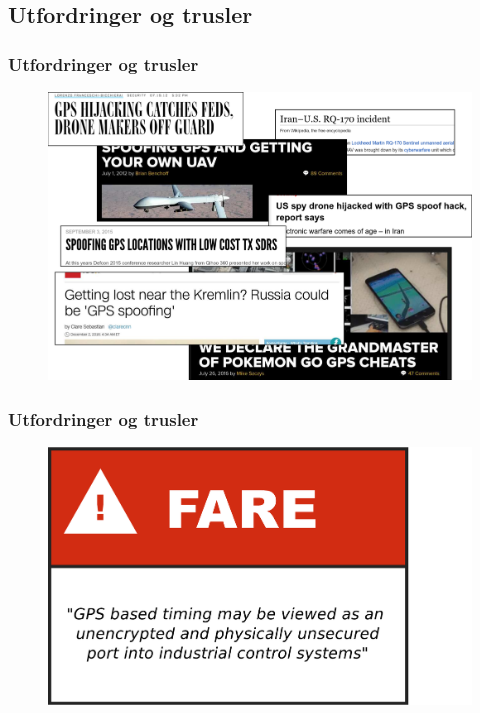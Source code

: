 \documentclass[xcolor=table]{beamer}
\begin{document}
\subsection{Utfordringer og trusler}
\begin{frame}
\frametitle{Utfordringer og trusler}
      \begin{figure}
        \includegraphics[scale=0.15]{thesis/graphics/montage.pdf}
      \end{figure}
\end{frame}

\begin{frame}
\frametitle{Utfordringer og trusler}
      \begin{figure}
        \includegraphics[scale=0.40]{thesis/graphics/fare.pdf}
      \end{figure} 
\end{frame}
\end{document}
